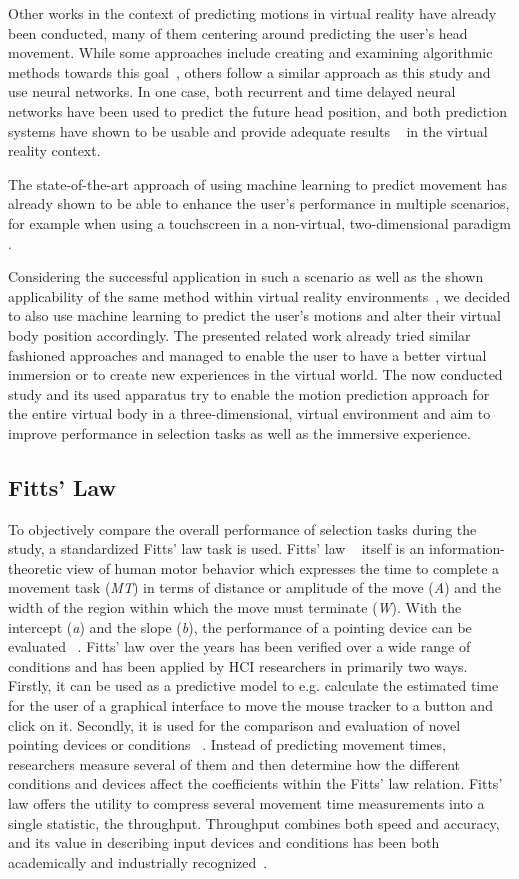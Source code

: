 \documentclass[sigconf]{acmart}
\begin{document}
Other works in the context of predicting motions in virtual reality have already been conducted, many of them centering around predicting the user's head movement. 
While some approaches include creating and examining algorithmic methods towards this goal~\cite{Aladagli2018}, others follow a similar approach as this study and use neural networks. In one case, both recurrent and time delayed neural networks have been used to predict the future head position, and both prediction systems have shown to be usable and provide adequate results ~\cite{Saad} in the virtual reality context.

The state-of-the-art approach of using machine learning to predict movement has already shown to be able to enhance the user's performance in multiple scenarios, for example when using a touchscreen in a non-virtual, two-dimensional paradigm \cite{Le2017}.

Considering the successful application in such a scenario as well as the shown applicability of the same method within virtual reality environments~\cite{Saad}, we decided to also use machine learning to predict the user's motions and alter their virtual body position accordingly.
The presented related work already tried similar fashioned approaches and managed to enable the user to have a better virtual immersion or to create new experiences in the virtual world.
The now conducted study and its used apparatus try to enable the motion prediction approach for the entire virtual body in a three-dimensional, virtual environment and aim to improve performance in selection tasks as well as the immersive experience. 

\subsection{Fitts' Law}
To objectively compare the overall performance of selection tasks during the study, a standardized Fitts' law task is used.
Fitts' law ~\cite{Information1954} itself is an information-theoretic view of human motor behavior which expresses the time to complete a movement task (\textit{MT}) in terms of distance or amplitude of the move (\textit{A}) and the width of the region within which the move must terminate (\textit{W}).
With the intercept (\textit{a}) and the slope (\textit{b}), the performance of a pointing device can be evaluated ~\cite{Mackenzie1989}.
Fitts' law over the years has been verified over a wide range of conditions and has been applied by HCI researchers in primarily two ways. 
Firstly, it can be used as a predictive model to e.g. calculate the estimated time for the user of a graphical interface to move the mouse tracker to a button and click on it. 
Secondly, it is used for the comparison and evaluation of novel pointing devices or conditions ~\cite{A2004}. 
Instead of predicting movement times, researchers measure several of them and then determine how the different conditions and devices affect the coefficients within the Fitts' law relation. 
Fitts' law offers the utility to compress several movement time measurements into a single statistic, the throughput.
Throughput combines both speed and accuracy, and its value in describing input devices and conditions has been both academically and industrially recognized~\cite{A2004}.
\end{document}

